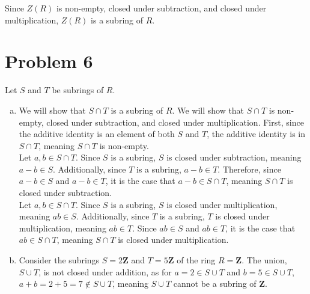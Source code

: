 \documentclass[10pt]{extarticle}
\begin{document}
  Since $Z(R)$ is non-empty, closed under subtraction, and closed under multiplication, $Z(R)$ is a subring of $R$.
  \section{Problem 6}%
  Let $S$ and $T$ be subrings of $R$.
  \begin{enumerate}[(a)]
    \item We will show that $S\cap T$ is a subring of $R$. We will show that $S\cap T$ is non-empty, closed under subtraction, and closed under multiplication. First, since the additive identity is an element of both $S$ and $T$, the additive identity is in $S\cap T$, meaning $S\cap T$ is non-empty.\\

      Let $a,b\in S\cap T$. Since $S$ is a subring, $S$ is closed under subtraction, meaning $a-b\in S$. Additionally, since $T$ is a subring, $a-b\in T$. Therefore, since $a-b \in S$ and $a-b\in T$, it is the case that $a-b\in S\cap T$, meaning $S\cap T$ is closed under subtraction.\\

      Let $a,b\in S\cap T$. Since $S$ is a subring, $S$ is closed under multiplication, meaning $ab\in S$. Additionally, since $T$ is a subring, $T$ is closed under multiplication, meaning $ab\in T$. Since $ab\in S$ and $ab\in T$, it is the case that $ab\in S\cap T$, meaning $S\cap T$ is closed under multiplication.
    \item Consider the subrings $S = 2\mathbf{Z}$ and $T = 5\mathbf{Z}$ of the ring $R = \mathbf{Z}$. The union, $S\cup T$, is not closed under addition, as for $a = 2\in S\cup T$ and $b = 5\in S\cup T $, $a + b = 2 + 5 = 7 \notin S\cup T$, meaning $S\cup T$ cannot be a subring of $\mathbf{Z}$.
  \end{enumerate}
\end{document}
